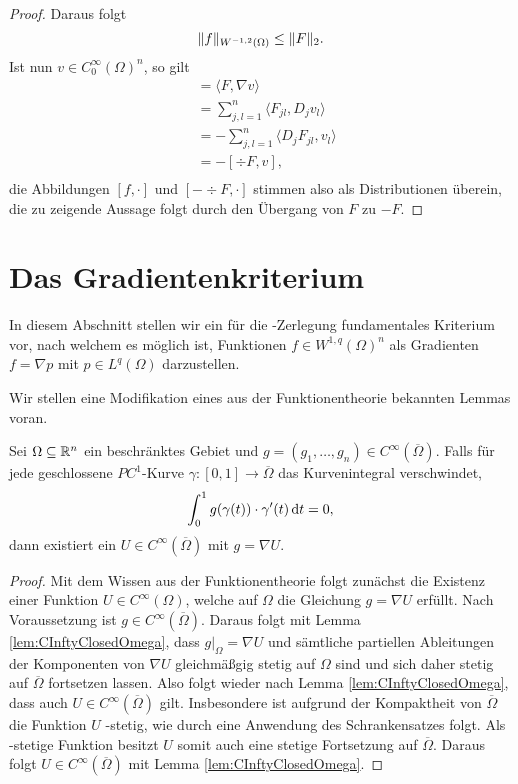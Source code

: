 \begin{proof}
  Daraus folgt
  $$
  \lVert f \rVert_{W^{-1,2}(\Omega)} \leq \lVert F \rVert_2.
  $$
  Ist nun $v \in C_0^\infty(\Omega)^n$, so gilt
  \begin{align*}
    [f,v]
    &= \langle F, \nabla v\rangle \\
    &= \sum_{j,l=1}^n \langle F_{jl}, D_j v_l \rangle \\
    &= -\sum_{j,l=1}^n \langle D_j F_{jl}, v_l \rangle \\
    &= -[\div F, v], \\
  \end{align*}
  die Abbildungen $[f,\cdot]$ und $[-\div F, \cdot]$ stimmen also als Distributionen überein, die zu zeigende Aussage folgt durch den Übergang von $F$ zu $-F$.
\end{proof}

\section{Das Gradientenkriterium}

In diesem Abschnitt stellen wir ein für die \helmholtz\hyp{}Zerlegung fundamentales Kriterium vor, nach welchem es möglich ist, Funktionen $f \in W^{1,q}(\Omega)^n$ als Gradienten $f = \nabla p$ mit $p \in L^q(\Omega)$ darzustellen.

Wir stellen eine Modifikation eines aus der Funktionentheorie bekannten Lemmas voran.

\begin{lem}
  \label{lem:existencePotential}
  Sei $\Omega \subseteq \mathbb{R}^n$ ein beschränktes Gebiet und $g = (g_1, \dots, g_n) \in C^\infty(\overline\Omega)$.
  Falls für jede geschlossene $PC^1$-Kurve $\gamma \colon [0,1] \to \overline\Omega$ das Kurvenintegral verschwindet,
$$
  \int_0^1 g(\gamma(t)) \cdot \gamma'(t) \, {\operatorname{d}\!{t}} = 0,  
$$
  dann existiert ein $U\in C^\infty(\overline\Omega)$ mit $g = \nabla U$.
\end{lem}

\begin{proof}
  Mit dem Wissen aus der Funktionentheorie folgt zunächst die Existenz einer Funktion $U \in C^\infty(\Omega)$, welche auf $\Omega$ die Gleichung $g = \nabla U$ erfüllt.
  Nach Voraussetzung ist $g \in C^\infty(\overline\Omega)$.
  Daraus folgt mit Lemma \ref{lem:CInftyClosedOmega}, dass $g|_\Omega = \nabla U$ und sämtliche partiellen Ableitungen der Komponenten von $\nabla U$ gleichmäßgig stetig auf $\Omega$ sind und sich daher stetig auf $\overline\Omega$ fortsetzen lassen.
  Also folgt wieder nach Lemma \ref{lem:CInftyClosedOmega}, dass auch $U \in C^\infty(\overline\Omega)$ gilt.
  Insbesondere ist aufgrund der Kompaktheit von $\overline\Omega$ die Funktion $U$ \lipschitz\hyp{}stetig, wie durch eine Anwendung des Schrankensatzes folgt.
  Als \lipschitz\hyp{}stetige Funktion besitzt $U$ somit auch eine stetige Fortsetzung auf $\overline\Omega$.
  Daraus folgt $U \in C^\infty(\overline\Omega)$ mit Lemma \ref{lem:CInftyClosedOmega}.
\end{proof}

